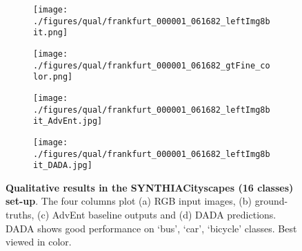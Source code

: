 \documentclass[10pt,twocolumn,letterpaper]{article}
\begin{document}
\begin{figure*}[t!]
\begin{center}
		\hdashrule[1ex][x]{17cm}{1.5pt}{1.5mm}\vspace{-0.13cm}
		\begin{subfigure}[t]{0.24\textwidth}\centering
			\texttt{[image: ./figures/qual/frankfurt\_000001\_061682\_leftImg8bit.png]}
		\end{subfigure}
		\begin{subfigure}[t]{0.24\textwidth}\centering
			\texttt{[image: ./figures/qual/frankfurt\_000001\_061682\_gtFine\_color.png]}
		\end{subfigure}
		\begin{subfigure}[t]{0.24\textwidth}\centering
			\texttt{[image: ./figures/qual/frankfurt\_000001\_061682\_leftImg8bit\_AdvEnt.jpg]}
		\end{subfigure}
		\begin{subfigure}[t]{0.24\textwidth}\centering
			\texttt{[image: ./figures/qual/frankfurt\_000001\_061682\_leftImg8bit\_DADA.jpg]}
		\end{subfigure}
	\end{center}
	\vspace{-0.3cm}
	\caption{\small \textbf{Qualitative results in the SYNTHIACityscapes (16 classes) set-up}. The four columns plot (a) RGB input images, (b) ground-truths, (c) AdvEnt baseline outputs and (d) DADA predictions. DADA shows good performance on `bus', `car', `bicycle' classes. Best viewed in color.}
	\vspace{-0.2cm}
	\label{fig:sup_qual_seg_1}
\end{figure*}
\end{document}
